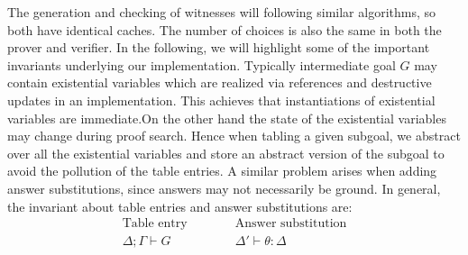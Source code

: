 \documentclass{llncs}
\newcommand{\figfoot}{\vspace{1ex}\hrule}
\newcommand{\vd}{\vdash}
\begin{document}
\begin{center}
\begin{small}
\begin{description}
\end{description}
\end{small}    
%
\end{center}


The generation and checking of witnesses will following similar
algorithms, so both have identical caches. The number of choices is
also the same in both the prover and verifier. 
In the following, we will highlight some of the important
invariants underlying our implementation. 
%
%
Typically intermediate goal
$G$ may contain existential  variables which are realized via
references and destructive updates in an implementation. This achieves
that instantiations of existential variables are immediate.On the
other hand the state of the existential variables may change during
proof search. Hence when tabling a given subgoal, we abstract over all the
existential variables and store an abstract version of the
subgoal to avoid the pollution of the table entries. A similar problem
arises when adding answer substitutions, since answers may not
necessarily be ground.
%
In general, the invariant about table entries and answer substitutions
are:
\[
\begin{array}{ll}
\mbox{Table entry}\quad\quad & \quad\mbox{Answer substitution}\\
\Delta ; \Gamma \vd G & \quad \Delta' \vd \theta : \Delta
\end{array}
\]
\end{document}

